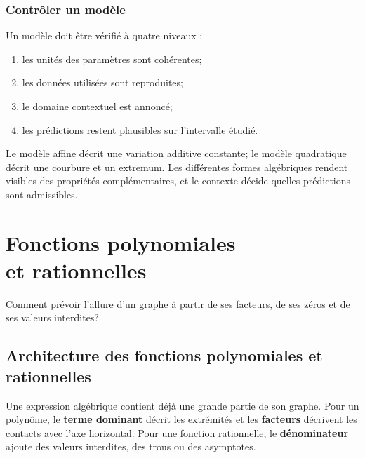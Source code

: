 \documentclass[12pt,a4paper,openany]{book}
\begin{document}
\subsection{Contrôler un modèle}

Un modèle doit être vérifié à quatre niveaux :
\begin{enumerate}
\item les unités des paramètres sont cohérentes;
\item les données utilisées sont reproduites;
\item le domaine contextuel est annoncé;
\item les prédictions restent plausibles sur l'intervalle étudié.
\end{enumerate}

\begin{summarybox}
Le modèle affine décrit une variation additive constante; le modèle quadratique décrit une courbure et un extremum. Les différentes formes algébriques rendent visibles des propriétés complémentaires, et le contexte décide quelles prédictions sont admissibles.
\end{summarybox}


\chapter[Polynômes et fonctions rationnelles]{Fonctions polynomiales\\et rationnelles}

\begin{questionbox}
Comment prévoir l'allure d'un graphe à partir de ses facteurs, de ses zéros et de ses valeurs interdites?
\end{questionbox}

\section{Architecture des fonctions polynomiales et rationnelles}

\begin{visualbox}
Une expression algébrique contient déjà une grande partie de son graphe. Pour un polynôme, le \textbf{terme dominant} décrit les extrémités et les \textbf{facteurs} décrivent les contacts avec l'axe horizontal. Pour une fonction rationnelle, le \textbf{dénominateur} ajoute des valeurs interdites, des trous ou des asymptotes.
\end{visualbox}
\end{document}
